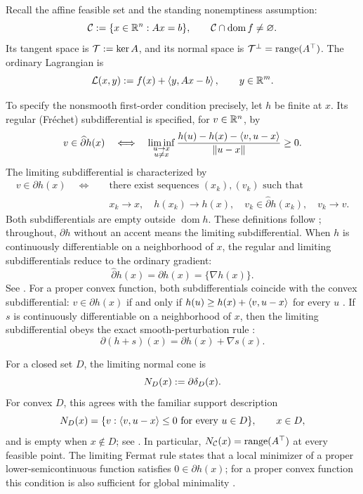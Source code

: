Recall the affine feasible set and the standing nonemptiness assumption:
\[
  \mathcal{C}:=\{x\in\mathbb{R}^n:Ax=b\},
  \qquad
  \mathcal{C}\cap\operatorname{dom} f\ne\varnothing .
\]
Its tangent space is \(\mathcal{T}:=\ker A\), and its normal space is
\(\mathcal{T}^\perp=\operatorname{range}(A^\top)\).  The ordinary Lagrangian is
\begin{equation}
  \mathcal{L}(x,y):=f(x)+\left\langle y,Ax-b\right\rangle,
  \qquad y\in\mathbb{R}^m .
  \label{eq:lagrangian}
\end{equation}

To specify the nonsmooth first-order condition precisely, let \(h\) be finite
at \(x\).  Its regular (Fr\'echet) subdifferential is specified, for
\(v\in\mathbb{R}^n\), by
\begin{equation}
  v\in\widehat{\partial}h(x)
  \quad\Longleftrightarrow\quad
  \liminf_{\substack{u\to x\\u\ne x}}
  \frac{h(u)-h(x)-\left\langle v,u-x\right\rangle}{\left\lVert u-x\right\rVert}
  \ge0 .
  \label{eq:frechet-subdifferential}
\end{equation}
The limiting subdifferential is characterized by
\begin{equation}
  \begin{aligned}
  v\in\partial h(x)
  \quad\Longleftrightarrow\quad&
  \text{there exist sequences }(x_k),(v_k)\text{ such that}\\
  &x_k\to x,\quad h(x_k)\to h(x),\quad
  v_k\in\widehat{\partial}h(x_k),\quad v_k\to v .
  \end{aligned}
  \label{eq:limiting-subdifferential}
\end{equation}
Both subdifferentials are empty outside \(\operatorname{dom}h\).  These
definitions
follow \citet[Definition~8.3]{RockafellarWets1998}; throughout,
\(\partial h\) without an accent means the limiting subdifferential.  When
\(h\) is continuously differentiable on a neighborhood of \(x\), the regular
and limiting subdifferentials reduce to the ordinary gradient:
\[
  \widehat{\partial}h(x)=\partial h(x)=\{\nabla h(x)\}.
\]
See \citet[Exercise~8.8(b)]{RockafellarWets1998}.
For a proper convex function, both subdifferentials coincide with the convex
subdifferential: \(v\in\partial h(x)\) if and only if
\(h(u)\ge h(x)+\left\langle v,u-x\right\rangle\) for every \(u\)
\citep[Proposition~8.12]{RockafellarWets1998}.
If \(s\) is continuously differentiable on a neighborhood of \(x\), then
the limiting subdifferential obeys the exact smooth-perturbation rule
\citep[Exercise~8.8(c)]{RockafellarWets1998}:
\[
  \partial(h+s)(x)=\partial h(x)+\nabla s(x).
\]

For a closed set \(D\), the limiting normal cone is
\[
  N_D(x):=\partial\delta_D(x).
\]
For convex \(D\), this agrees with the familiar support description
\[
  N_D(x)
  =
  \{v:\left\langle v,u-x\right\rangle\le0\ \text{for every }u\in D\},
  \qquad x\in D,
\]
and is empty when \(x\notin D\); see
\citet[Theorem~6.9 and Exercise~8.14]{RockafellarWets1998}.  In particular,
\(N_{\mathcal{C}}(x)=\operatorname{range}(A^\top)\) at every feasible point.  The limiting Fermat
rule states that a local minimizer of a proper lower-semicontinuous function
satisfies \(0\in\partial h(x)\); for a proper convex function this condition is
also sufficient for global minimality
\citep[Theorem~10.1]{RockafellarWets1998}.

